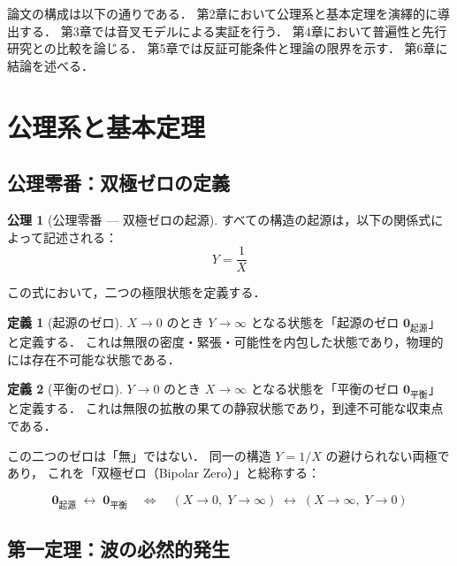 \documentclass[12pt, a4paper]{article}
\theoremstyle{definition}
\newtheorem{axiom}{公理}
\newtheorem{definition}{定義}
\newcommand{\vorigin}{\mathbf{0}_{\text{起源}}}
\newcommand{\vequil}{\mathbf{0}_{\text{平衡}}}
\begin{document}
論文の構成は以下の通りである．
第2章において公理系と基本定理を演繹的に導出する．
第3章では音叉モデルによる実証を行う．
第4章において普遍性と先行研究との比較を論じる．
第5章では反証可能条件と理論の限界を示す．
第6章に結論を述べる．

\section{公理系と基本定理}

\subsection{公理零番：双極ゼロの定義}

\begin{axiom}[公理零番 --- 双極ゼロの起源]
  すべての構造の起源は，以下の関係式によって記述される：
  \begin{equation}
    Y = \frac{1}{X}
    \label{eq:axiom0}
  \end{equation}
\end{axiom}

この式において，二つの極限状態を定義する．

\begin{definition}[起源のゼロ]
  $X \to 0$ のとき $Y \to \infty$ となる状態を「起源のゼロ $\vorigin$」と定義する．
  これは無限の密度・緊張・可能性を内包した状態であり，物理的には存在不可能な状態である．
\end{definition}

\begin{definition}[平衡のゼロ]
  $Y \to 0$ のとき $X \to \infty$ となる状態を「平衡のゼロ $\vequil$」と定義する．
  これは無限の拡散の果ての静寂状態であり，到達不可能な収束点である．
\end{definition}

この二つのゼロは「無」ではない．
同一の構造 $Y = 1/X$ の避けられない両極であり，
これを「双極ゼロ（Bipolar Zero）」と総称する：

\begin{equation}
  \vorigin \;\longleftrightarrow\; \vequil
  \quad \Longleftrightarrow \quad
  (X \to 0,\; Y \to \infty) \;\longleftrightarrow\; (X \to \infty,\; Y \to 0)
\end{equation}

\subsection{第一定理：波の必然的発生}
\end{document}
